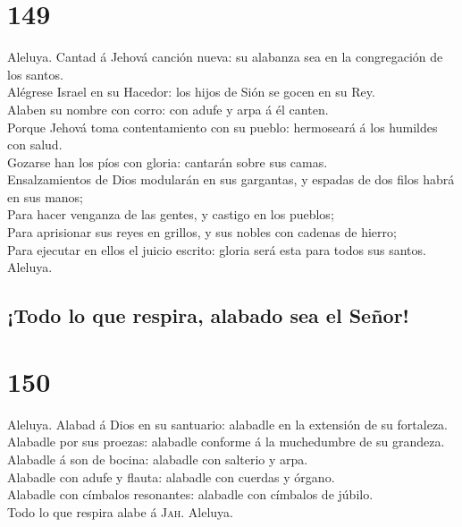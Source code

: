 \hypertarget{section-19-149}{%
\section{149}\label{section-19-149}}

 Aleluya. Cantad á Jehová canción nueva: su alabanza sea
en la congregación de los santos.\\
 Alégrese Israel en su Hacedor: los hijos de Sión se gocen
en su Rey.\\
 Alaben su nombre con corro: con adufe y arpa á él
canten.\\
 Porque Jehová toma contentamiento con su pueblo:
hermoseará á los humildes con salud.\\
 Gozarse han los píos con gloria: cantarán sobre sus
camas.\\
 Ensalzamientos de Dios modularán en sus gargantas, y
espadas de dos filos habrá en sus manos;\\
 Para hacer venganza de las gentes, y castigo en los
pueblos;\\
 Para aprisionar sus reyes en grillos, y sus nobles con
cadenas de hierro;\\
 Para ejecutar en ellos el juicio escrito: gloria será
esta para todos sus santos. Aleluya.

\hypertarget{todo-lo-que-respira-alabado-sea-el-seuxf1or}{%
\subsection{¡Todo lo que respira, alabado sea el
Señor!}\label{todo-lo-que-respira-alabado-sea-el-seuxf1or}}

\hypertarget{section-19-150}{%
\section{150}\label{section-19-150}}

 Aleluya. Alabad á Dios en su santuario: alabadle en la
extensión de su fortaleza.\\
 Alabadle por sus proezas: alabadle conforme á la
muchedumbre de su grandeza.\\
 Alabadle á son de bocina: alabadle con salterio y arpa.\\
 Alabadle con adufe y flauta: alabadle con cuerdas y
órgano.\\
 Alabadle con címbalos resonantes: alabadle con címbalos
de júbilo.\\
 Todo lo que respira alabe á \textsc{Jah}. Aleluya.
